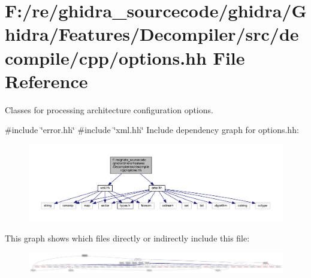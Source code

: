 \hypertarget{options_8hh}{}\section{F\+:/re/ghidra\+\_\+sourcecode/ghidra/\+Ghidra/\+Features/\+Decompiler/src/decompile/cpp/options.hh File Reference}
\label{options_8hh}


Classes for processing architecture configuration options.  


{\ttfamily \#include \char`\"{}error.\+hh\char`\"{}}\newline
{\ttfamily \#include \char`\"{}xml.\+hh\char`\"{}}\newline
Include dependency graph for options.\+hh\+:
\nopagebreak
\begin{figure}[H]
\begin{center}
\leavevmode
\includegraphics[width=350pt]{options_8hh__incl}
\end{center}
\end{figure}
This graph shows which files directly or indirectly include this file\+:
\nopagebreak
\begin{figure}[H]
\begin{center}
\leavevmode
\includegraphics[width=350pt]{options_8hh__dep__incl}
\end{center}
\end{figure}

